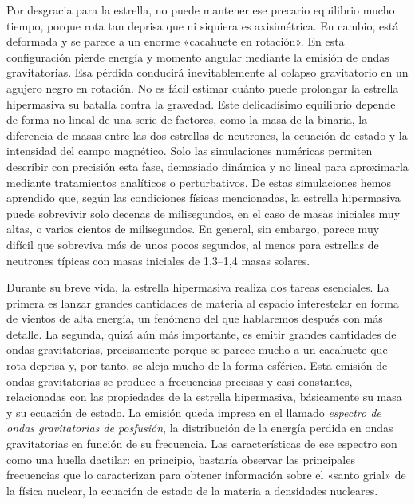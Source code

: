 Por desgracia para la estrella, no puede mantener ese precario equilibrio mucho tiempo, porque rota tan deprisa que ni siquiera es axisimétrica. En cambio, está deformada y se parece a un enorme «cacahuete en rotación». En esta configuración pierde energía y momento angular mediante la emisión de ondas gravitatorias. Esa pérdida conducirá inevitablemente al colapso gravitatorio en un agujero negro en rotación. No es fácil estimar cuánto puede prolongar la estrella hipermasiva su batalla contra la gravedad. Este delicadísimo equilibrio depende de forma no lineal de una serie de factores, como la masa de la binaria, la diferencia de masas entre las dos estrellas de neutrones, la ecuación de estado y la intensidad del campo magnético. Solo las simulaciones numéricas permiten describir con precisión esta fase, demasiado dinámica y no lineal para aproximarla mediante tratamientos analíticos o perturbativos. De estas simulaciones hemos aprendido que, según las condiciones físicas mencionadas, la estrella hipermasiva puede sobrevivir solo decenas de milisegundos, en el caso de masas iniciales muy altas, o varios cientos de milisegundos. En general, sin embargo, parece muy difícil que sobreviva más de unos pocos segundos, al menos para estrellas de neutrones típicas con masas iniciales de 1,3--1,4 masas solares.

Durante su breve vida, la estrella hipermasiva realiza dos tareas esenciales. La primera es lanzar grandes cantidades de materia al espacio interestelar en forma de vientos de alta energía, un fenómeno del que hablaremos después con más detalle. La segunda, quizá aún más importante, es emitir grandes cantidades de ondas gravitatorias, precisamente porque se parece mucho a un cacahuete que rota deprisa y, por tanto, se aleja mucho de la forma esférica. Esta emisión de ondas gravitatorias se produce a frecuencias precisas y casi constantes, relacionadas con las propiedades de la estrella hipermasiva, básicamente su masa y su ecuación de estado. La emisión queda impresa en el llamado \emph{espectro de ondas gravitatorias de posfusión}, la distribución de la energía perdida en ondas gravitatorias en función de su frecuencia. Las características de ese espectro son como una huella dactilar: en principio, bastaría observar las principales frecuencias que lo caracterizan para obtener información sobre el «santo grial» de la física nuclear, la ecuación de estado de la materia a densidades nucleares.

